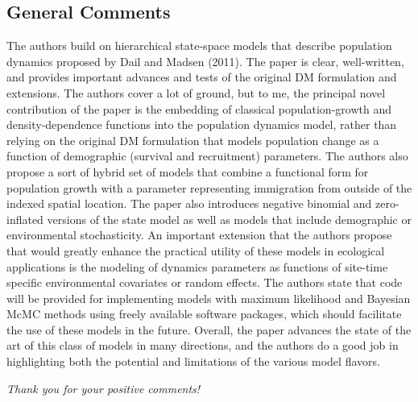 \documentclass[12pt,english]{article}
\begin{document}
\begin{spacing}{1.9}
\begin{flushleft}
\subsection*{General Comments}
The authors build on hierarchical state-space models that describe population
dynamics proposed by Dail and Madsen (2011). The paper is clear, well-written,
and provides important advances and tests of the original DM formulation and
extensions. The authors cover a lot of ground, but to me, the principal novel
contribution of the paper is the embedding of classical population-growth and
density-dependence functions into the population dynamics model, rather than
relying on the original DM formulation that models population change as a
function of demographic (survival and recruitment) parameters. The authors also
propose a sort of hybrid set of models that combine a functional form for
population growth with a parameter representing immigration from outside of the
indexed spatial location. The paper also introduces negative binomial and
zero-inflated versions of the state model as well as models that include
demographic or environmental stochasticity. An important extension that
the authors propose that would greatly enhance the practical utility of these
models in ecological applications is the modeling of dynamics parameters as
functions of site-time specific environmental covariates or random effects. The
authors state that code will be provided for implementing models with maximum
likelihood and Bayesian McMC methods using freely available software packages,
which should facilitate the use of these models in the future. Overall, the
paper advances the state of the art of this class of models in many directions,
and the authors do a good job in highlighting both the potential and limitations
of the various model flavors.

\vspace{0.5cm}
\textit{Thank you for your positive comments!}
\vspace{0.5cm}


\end{flushleft}
\end{spacing}
\end{document}

